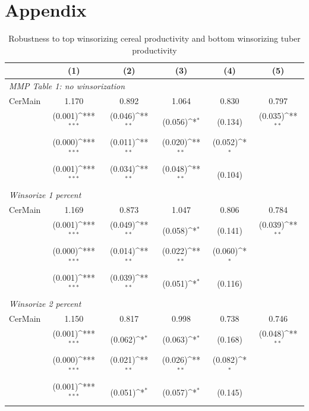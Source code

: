 \documentclass[11pt]{article}
\begin{document}
\clearpage
\appendix
\section*{Appendix}

\setcounter{table}{0}
\renewcommand{\thetable}{A\arabic{table}}

\begin{table}[htbp]\centering
\footnotesize
\def\sym#1{\ifmmode^{#1}\else\(^{#1}\)\fi}
\caption{Robustness to top winsorizing cereal productivity and bottom winsorizing tuber productivity}
\label{tab:appendix}
\begin{tabular}{l*{5}{c}}
\hline\hline
&\multicolumn{1}{c}{(1)}&\multicolumn{1}{c}{(2)}&\multicolumn{1}{c}{(3)}&\multicolumn{1}{c}{(4)}&\multicolumn{1}{c}{(5)}\\
\hline
\multicolumn{6}{l}{\textit{MMP Table 1: no winsorization}}\\
CerMain  &    1.170  &    0.892  &    1.064  &    0.830  &    0.797  \\
         &  (0.001)\sym{***}&  (0.046)\sym{**} &  (0.056)\sym{*}  &  (0.134)  &  (0.035)\sym{**} \\
         &  (0.000)\sym{***} & (0.011)\sym{**} & (0.020)\sym{**}  & (0.052)\sym{*} & \\
         &  (0.001)\sym{***} & (0.034)\sym{**} & (0.048)\sym{**} & (0.104) & \\
\hline
\multicolumn{6}{l}{\textit{Winsorize 1 percent}}\\
CerMain  &    1.169  &    0.873  &    1.047  &    0.806  &    0.784  \\
         &  (0.001)\sym{***}&  (0.049)\sym{**} &  (0.058)\sym{*}  &  (0.141)  &  (0.039)\sym{**} \\
         &  (0.000)\sym{***} & (0.014)\sym{**} & (0.022)\sym{**} & (0.060)\sym{*} & \\
         &  (0.001)\sym{***} & (0.039)\sym{**} & (0.051)\sym{*} & (0.116) & \\
\hline
\multicolumn{6}{l}{\textit{Winsorize 2 percent}}\\
CerMain  &    1.150  &    0.817  &    0.998  &    0.738  &    0.746  \\
         &  (0.001)\sym{***}&  (0.062)\sym{*}  &  (0.063)\sym{*}  &  (0.168)  &  (0.048)\sym{**} \\
         &  (0.000)\sym{***} & (0.021)\sym{**} & (0.026)\sym{**} & (0.082)\sym{*} & \\
         &  (0.001)\sym{***} & (0.051)\sym{*} & (0.057)\sym{*} & (0.145) & \\
         

\end{tabular}
\end{table}
\end{document}

